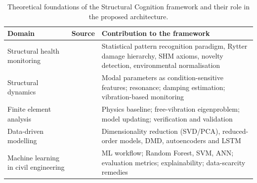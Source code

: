 \begin{table}[htbp]
\centering
\caption{Theoretical foundations of the Structural Cognition framework and their role in the proposed architecture.}
\label{tab:pillars}
\begin{tabularx}{\linewidth}{@{}l l X@{}}
\toprule
\textbf{Domain} & \textbf{Source} & \textbf{Contribution to the framework} \\
\midrule
Structural health monitoring & \citep{farrar2013shm} & Statistical pattern recognition paradigm, Rytter damage hierarchy, SHM axioms, novelty detection, environmental normalisation \\
Structural dynamics & \citep{chopra2017dynamics} & Modal parameters as condition-sensitive features; resonance; damping estimation; vibration-based monitoring \\
Finite element analysis & \citep{cook2002fea} & Physics baseline; free-vibration eigenproblem; model updating; verification and validation \\
Data-driven modelling & \citep{brunton2019data} & Dimensionality reduction (SVD/PCA), reduced-order models, DMD, autoencoders and LSTM \\
Machine learning in civil engineering & \citep{naser2023ml} & ML workflow; Random Forest, SVM, ANN; evaluation metrics; explainability; data-scarcity remedies \\
\bottomrule
\end{tabularx}
\end{table}
